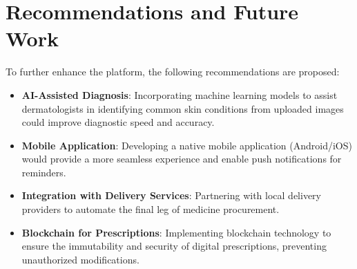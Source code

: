 \documentclass[12pt,a4paper]{report}
\begin{document}
\section{Recommendations and Future Work}
To further enhance the platform, the following recommendations are proposed:
\begin{itemize}
    \item \textbf{AI-Assisted Diagnosis}: Incorporating machine learning models to assist dermatologists in identifying common skin conditions from uploaded images could improve diagnostic speed and accuracy.
    \item \textbf{Mobile Application}: Developing a native mobile application (Android/iOS) would provide a more seamless experience and enable push notifications for reminders.
    \item \textbf{Integration with Delivery Services}: Partnering with local delivery providers to automate the final leg of medicine procurement.
    \item \textbf{Blockchain for Prescriptions}: Implementing blockchain technology to ensure the immutability and security of digital prescriptions, preventing unauthorized modifications.
\end{itemize}
\end{document}
